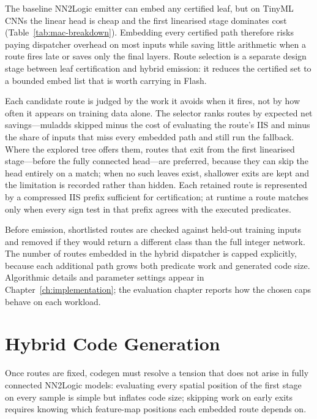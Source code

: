 The baseline NN2Logic emitter can embed any certified leaf, but on TinyML \acp{CNN} the linear head is cheap and the first linearised stage dominates cost (Table~\ref{tab:mac-breakdown}).
Embedding every certified path therefore risks paying dispatcher overhead on most inputs while saving little arithmetic when a route fires late or saves only the final layers.
Route selection is a separate design stage between leaf certification and hybrid emission: it reduces the certified set to a bounded embed list that is worth carrying in Flash.

Each candidate route is judged by the work it avoids when it fires, not by how often it appears on training data alone.
The selector ranks routes by expected net savings---muladds skipped minus the cost of evaluating the route's \ac{IIS} and minus the share of inputs that miss every embedded path and still run the fallback.
Where the explored tree offers them, routes that exit from the first linearised stage---before the fully connected head---are preferred, because they can skip the head entirely on a match; when no such leaves exist, shallower exits are kept and the limitation is recorded rather than hidden.
Each retained route is represented by a compressed \ac{IIS} prefix sufficient for certification; at runtime a route matches only when every sign test in that prefix agrees with the executed predicates.

Before emission, shortlisted routes are checked against held-out training inputs and removed if they would return a different class than the full integer network.
The number of routes embedded in the hybrid dispatcher is capped explicitly, because each additional path grows both predicate work and generated code size.
Algorithmic details and parameter settings appear in Chapter~\ref{ch:implementation}; the evaluation chapter reports how the chosen caps behave on each workload.


\section{Hybrid Code Generation}
\label{sec:design-codegen}

Once routes are fixed, codegen must resolve a tension that does not arise in fully connected NN2Logic models: evaluating every spatial position of the first stage on every sample is simple but inflates code size; skipping work on early exits requires knowing which feature-map positions each embedded route depends on.

